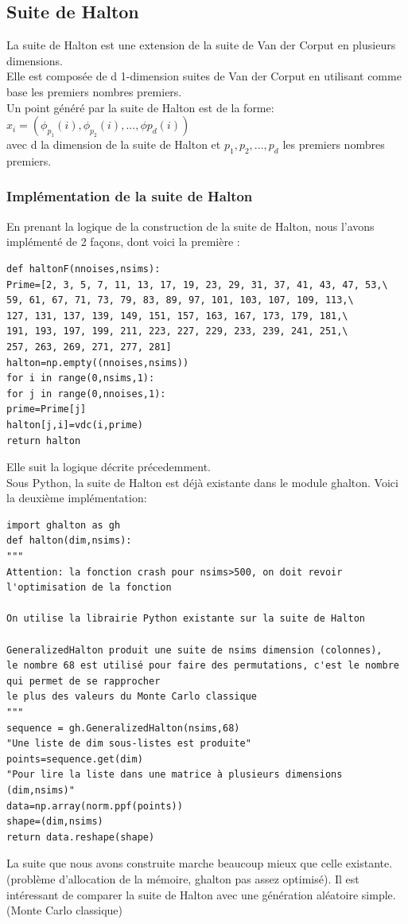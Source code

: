 \documentclass[12pt]{report}
\begin{document}
\subsection{Suite de Halton}

La suite de Halton est une extension de la suite de Van der Corput en plusieurs dimensions.\\
Elle est composée de d 1-dimension suites de Van der Corput en utilisant comme base les premiers nombres premiers.\\
Un point généré par la suite de Halton est de la forme:\\
$x_i=(\phi_{p_1}(i),\phi_{p_2}(i),...,\phi{p_d}(i))$\\
avec d la dimension de la suite de Halton et $p_1,p_2,...,p_d$ les premiers nombres premiers.\\

\subsubsection{Implémentation de la suite de Halton}
En prenant la logique de la construction de la suite de Halton, nous l'avons implémenté de 2 façons, dont voici la première :\\
\begin{lstlisting}
def haltonF(nnoises,nsims):
Prime=[2, 3, 5, 7, 11, 13, 17, 19, 23, 29, 31, 37, 41, 43, 47, 53,\
59, 61, 67, 71, 73, 79, 83, 89, 97, 101, 103, 107, 109, 113,\
127, 131, 137, 139, 149, 151, 157, 163, 167, 173, 179, 181,\
191, 193, 197, 199, 211, 223, 227, 229, 233, 239, 241, 251,\
257, 263, 269, 271, 277, 281]
halton=np.empty((nnoises,nsims))
for i in range(0,nsims,1):
for j in range(0,nnoises,1):
prime=Prime[j]
halton[j,i]=vdc(i,prime)
return halton
\end{lstlisting}
Elle suit la logique décrite précedemment.\\
\newpage
Sous Python, la suite de Halton est déjà existante dans le module ghalton. Voici la deuxième implémentation:\\
\begin{lstlisting}
import ghalton as gh
def halton(dim,nsims):
"""
Attention: la fonction crash pour nsims>500, on doit revoir l'optimisation de la fonction

On utilise la librairie Python existante sur la suite de Halton

GeneralizedHalton produit une suite de nsims dimension (colonnes),
le nombre 68 est utilisé pour faire des permutations, c'est le nombre qui permet de se rapprocher
le plus des valeurs du Monte Carlo classique
"""
sequence = gh.GeneralizedHalton(nsims,68)
"Une liste de dim sous-listes est produite"
points=sequence.get(dim)
"Pour lire la liste dans une matrice à plusieurs dimensions (dim,nsims)"
data=np.array(norm.ppf(points))
shape=(dim,nsims)
return data.reshape(shape)
\end{lstlisting}
La suite que nous avons construite marche beaucoup mieux que celle existante. (problème d'allocation de la mémoire, ghalton pas assez optimisé).
\newpage
Il est intéressant de comparer la suite de Halton avec une génération aléatoire simple. (Monte Carlo classique)\\
\end{document}
